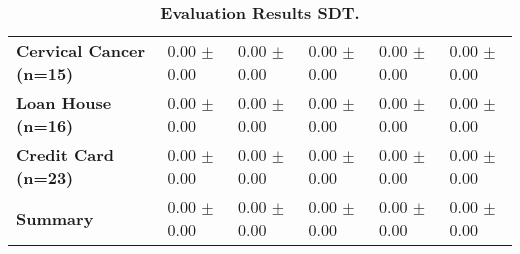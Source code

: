 \begin{table}[htb]
{\begin{tabular}{llllll}
\textbf{Cervical Cancer (n=15)                   } &  \phantom{0}0.00 $\pm$ \phantom{0}0.00 &             \phantom{0}0.00 $\pm$ \phantom{0}0.00 &  \phantom{0}0.00 $\pm$ \phantom{0}0.00 &  \phantom{0}0.00 $\pm$ \phantom{0}0.00 &  \phantom{0}0.00 $\pm$ \phantom{0}0.00 \\
\textbf{Loan House (n=16)                        } &  \phantom{0}0.00 $\pm$ \phantom{0}0.00 &             \phantom{0}0.00 $\pm$ \phantom{0}0.00 &  \phantom{0}0.00 $\pm$ \phantom{0}0.00 &  \phantom{0}0.00 $\pm$ \phantom{0}0.00 &  \phantom{0}0.00 $\pm$ \phantom{0}0.00 \\
\textbf{Credit Card (n=23)                       } &  \phantom{0}0.00 $\pm$ \phantom{0}0.00 &             \phantom{0}0.00 $\pm$ \phantom{0}0.00 &  \phantom{0}0.00 $\pm$ \phantom{0}0.00 &  \phantom{0}0.00 $\pm$ \phantom{0}0.00 &  \phantom{0}0.00 $\pm$ \phantom{0}0.00 \\
\midrule
\textbf{Summary                                  } &  \phantom{0}0.00 $\pm$ \phantom{0}0.00 &             \phantom{0}0.00 $\pm$ \phantom{0}0.00 &  \phantom{0}0.00 $\pm$ \phantom{0}0.00 &  \phantom{0}0.00 $\pm$ \phantom{0}0.00 &  \phantom{0}0.00 $\pm$ \phantom{0}0.00 \\
\bottomrule
\end{tabular}%
}
\caption{\textbf{Evaluation Results SDT.}}
\label{tab:eval-results}
\end{table}


